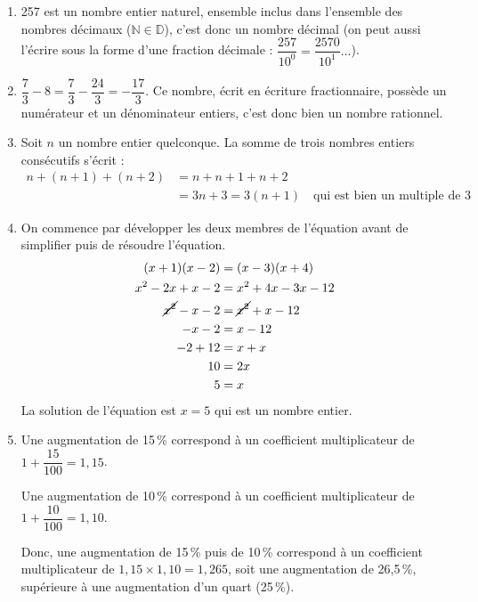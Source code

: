 \begin{enumerate}
    \item 257 est un nombre entier naturel, ensemble inclus dans l'ensemble des nombres décimaux ($\mathbb{N}\in\mathbb{D}$), c'est donc un nombre décimal (on peut aussi l'écrire sous la forme d'une fraction décimale : $\dfrac{257}{10^0} =\dfrac{2570}{10^1}\dots$). \par
    \item $\dfrac73-8 =\dfrac73-\dfrac{24}{3} =-\dfrac{17}{3}$. Ce nombre, écrit en écriture fractionnaire, possède un numérateur et un dénominateur entiers, c'est donc bien un nombre rationnel. \par
    \item Soit $n$ un nombre entier quelconque. La somme de trois nombres entiers consécutifs s'écrit : \vskip-7mm
       \begin{align*}
          n+(n+1)+(n+2) &=n+n+1+n+2 \\
          &=3n+3 =3(n+1) \quad \text{qui est bien un multiple de 3}
       \end{align*}
    \item On commence par développer les deux membres de l'équation avant de simplifier puis de résoudre l'équation.
       \begin{align*}
          (x+1)(x-2) &=(x-3)(x+4) \\
          x^2-2x+x-2 &=x^2+4x-3x-12 \\
          \cancel{x^2}-x-2 &=\cancel{x^2}+x-12 \\
          -x-2 &=x-12 \\
          -2+12 &=x+x \\
          10 &=2x \\
          5 &=x
       \end{align*}
       La solution de l'équation est $x =5$ qui est un nombre entier. \par
    \item Une augmentation de 15\,\% correspond à un coefficient multiplicateur de $1+\dfrac{15}{100} =1,15$. \par
       Une augmentation de 10\,\% correspond à un coefficient multiplicateur de $1+\dfrac{10}{100} =1,10$. \par
       Donc, une augmentation de 15\,\% puis de 10\,\% correspond à un coefficient multiplicateur de $1,15\times1,10 =1,265$, soit une augmentation de 26,5\,\%, supérieure à une augmentation d'un quart (25\,\%). \par

\end{enumerate}
